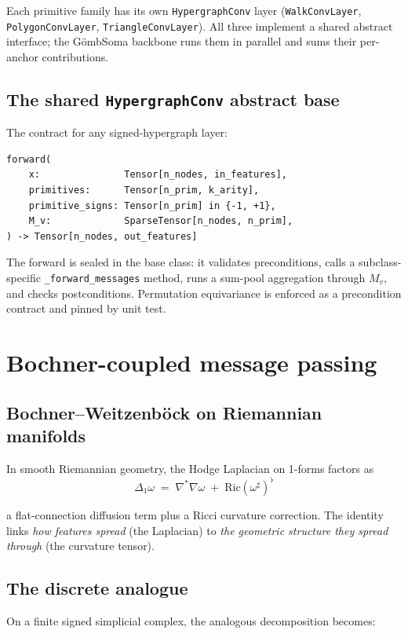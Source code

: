 \documentclass[11pt,a4paper]{article}
\newcommand{\GS}{G\"ombSoma}
\begin{document}
Each primitive family has its own \texttt{HypergraphConv} layer
(\texttt{WalkConvLayer}, \texttt{PolygonConvLayer},
\texttt{TriangleConvLayer}). All three implement a shared
abstract interface; the \GS{} backbone runs them in parallel and
sums their per-anchor contributions.

\subsection{The shared \texttt{HypergraphConv} abstract base}

The contract for any signed-hypergraph layer:

\begin{verbatim}
forward(
    x:               Tensor[n_nodes, in_features],
    primitives:      Tensor[n_prim, k_arity],
    primitive_signs: Tensor[n_prim] in {-1, +1},
    M_v:             SparseTensor[n_nodes, n_prim],
) -> Tensor[n_nodes, out_features]
\end{verbatim}

The forward is sealed in the base class: it validates preconditions,
calls a subclass-specific \texttt{\_forward\_messages} method, runs
a sum-pool aggregation through $M_v$, and checks postconditions.
Permutation equivariance is enforced as a precondition contract
and pinned by unit test.

\section{Bochner-coupled message passing}

\subsection{Bochner--Weitzenböck on Riemannian manifolds}

In smooth Riemannian geometry, the Hodge Laplacian on 1-forms
factors as
\[
\Delta_1 \omega \;=\; \nabla^* \nabla \omega \;+\; \mathrm{Ric}(\omega^\sharp)^\flat
\]

a flat-connection diffusion term plus a Ricci curvature correction.
The identity links \emph{how features spread} (the Laplacian) to
\emph{the geometric structure they spread through} (the curvature
tensor).

\subsection{The discrete analogue}

On a finite signed simplicial complex, the analogous decomposition
becomes:
\end{document}
